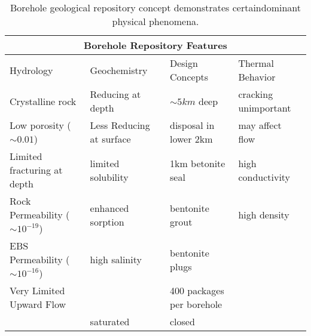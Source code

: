 %
\begin{table}[h!]
  \centering
  \footnotesize{
  \begin{tabular}{|l|l|l|l|}
    \multicolumn{4}{c}{\textbf{Borehole Repository Features}}\\
    \hline
    Hydrology & Geochemistry & Design Concepts & Thermal Behavior \\ 
    \hline
    Crystalline rock&Reducing at depth& $\sim5km$ deep & cracking unimportant\\
    Low porosity ($\sim 0.01$)&Less Reducing at surface& disposal in lower 2km &may affect flow\\
    Limited fracturing at depth&limited solubility &1km betonite seal & high conductivity\\
    Rock Permeability ($\sim 10^{-19}$) &enhanced sorption &bentonite grout &high density\\
    EBS Permeability ($\sim 10^{-16}$) &high salinity&bentonite plugs&\\
    Very Limited Upward Flow&&400 packages per borehole&\\
    &saturated&closed&\\
    \hline
  \end{tabular}
  \caption[Borehole repository features.]{Borehole geological repository 
  concept demonstrates certaindominant physical phenomena. }
  \label{tab:borehole_tab}
  }
\end{table}
